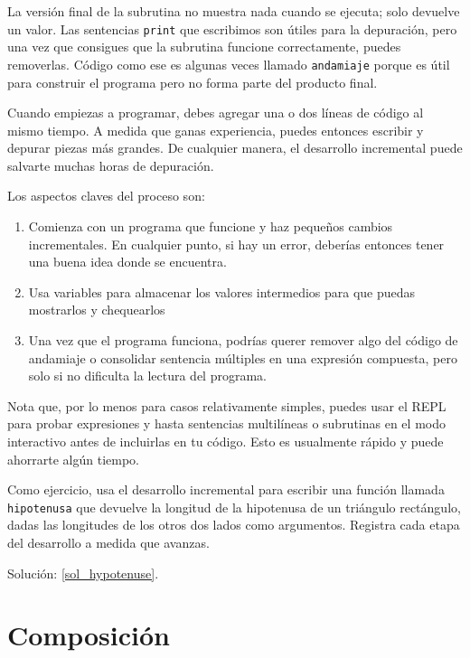 La versión final de la subrutina no muestra nada cuando se ejecuta;
solo devuelve un valor. Las sentencias {\tt print} que escribimos
son útiles para la depuración, pero una vez que consigues que la subrutina
funcione correctamente, puedes removerlas. Código como ese es algunas
veces llamado {\tt andamiaje} porque es útil para construir el programa
pero no forma parte del producto final.

Cuando empiezas a programar, debes agregar una o dos líneas de código
al mismo tiempo. A medida que ganas experiencia, puedes entonces escribir
y depurar piezas más grandes. De cualquier manera, el desarrollo incremental
puede salvarte muchas horas de depuración.

Los aspectos claves del proceso son:
\begin{enumerate}

\item Comienza con un programa que funcione y haz pequeños cambios
incrementales. En cualquier punto, si hay un error, deberías entonces
tener una buena idea donde se encuentra.

\item Usa variables para almacenar los valores intermedios
para que puedas mostrarlos y chequearlos

\item Una vez que el programa funciona, podrías querer remover
algo del código de andamiaje o consolidar sentencia múltiples
en una expresión compuesta, pero solo si no dificulta la lectura
del programa.

\end{enumerate}

Nota que, por lo menos para casos relativamente simples, 
puedes usar el REPL para probar expresiones y hasta sentencias
multilíneas o subrutinas en el modo interactivo antes de 
incluirlas en tu código. Esto es usualmente rápido y puede 
ahorrarte algún tiempo.

\label{hypotenuse}
Como ejercicio, usa el desarrollo incremental para escribir
una función llamada {\tt hipotenusa} que devuelve la longitud de
la hipotenusa de un triángulo rectángulo, dadas las longitudes de
los otros dos lados como argumentos. Registra cada etapa del
desarrollo a medida que avanzas.

Solución: \ref{sol_hypotenuse}.



\section{Composición}

